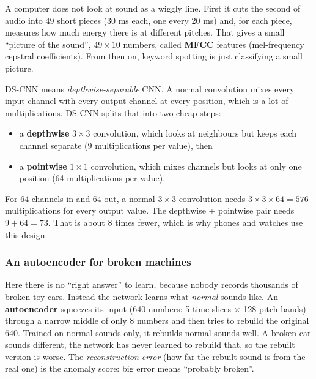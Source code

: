A computer does not look at sound as a wiggly line. First it cuts the second of audio into 49 short pieces
(30 ms each, one every 20 ms) and, for each piece, measures how much energy there is at different pitches. That
gives a small ``picture of the sound'', $49\times10$ numbers, called \textbf{MFCC} features (mel-frequency
cepstral coefficients). From then on, keyword spotting is just classifying a small picture.

DS-CNN means \emph{depthwise-separable} CNN. A normal convolution mixes every input channel with every output
channel at every position, which is a lot of multiplications. DS-CNN splits that into two cheap steps:

\begin{itemize}
  \item a \textbf{depthwise} $3\times3$ convolution, which looks at neighbours but keeps each channel separate
        (9 multiplications per value), then
  \item a \textbf{pointwise} $1\times1$ convolution, which mixes channels but looks at only one position
        (64 multiplications per value).
\end{itemize}

\begin{example}
For 64 channels in and 64 out, a normal $3\times3$ convolution needs $3\times3\times64 = 576$ multiplications
for every output value. The depthwise + pointwise pair needs $9 + 64 = 73$. That is about 8 times fewer, which
is why phones and watches use this design.
\end{example}

\subsubsection*{An autoencoder for broken machines}

Here there is no ``right answer'' to learn, because nobody records thousands of broken toy cars. Instead the
network learns what \emph{normal} sounds like. An \textbf{autoencoder} squeezes its input (640 numbers: 5 time
slices $\times$ 128 pitch bands) through a narrow middle of only 8 numbers and then tries to rebuild the
original 640. Trained on normal sounds only, it rebuilds normal sounds well. A broken car sounds different, the
network has never learned to rebuild that, so the rebuilt version is worse. The \emph{reconstruction error}
(how far the rebuilt sound is from the real one) is the anomaly score: big error means ``probably broken''.

